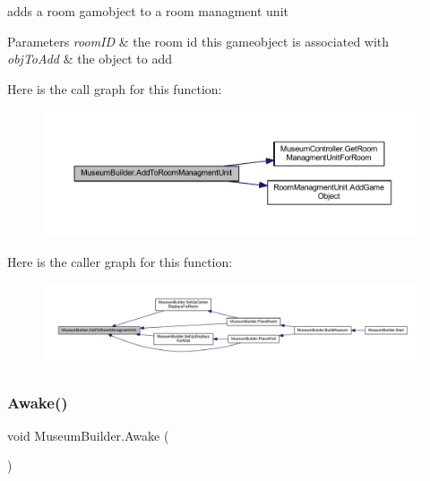 adds a room gamobject to a room managment unit 


\begin{DoxyParams}{Parameters}
{\em room\+ID} & the room id this gameobject is associated with\\
\hline
{\em obj\+To\+Add} & the object to add\\
\hline
\end{DoxyParams}
Here is the call graph for this function\+:
\nopagebreak
\begin{figure}[H]
\begin{center}
\leavevmode
\includegraphics[width=350pt]{class_museum_builder_ad1991ecd1258a2eb6d020d3c429ad9c8_cgraph}
\end{center}
\end{figure}
Here is the caller graph for this function\+:
\nopagebreak
\begin{figure}[H]
\begin{center}
\leavevmode
\includegraphics[width=350pt]{class_museum_builder_ad1991ecd1258a2eb6d020d3c429ad9c8_icgraph}
\end{center}
\end{figure}
\mbox{\label{class_museum_builder_a846546ea2e9bf91bba2a166dc2b01e2d}} 
\subsubsection{\texorpdfstring{Awake()}{Awake()}}
{\footnotesize\ttfamily void Museum\+Builder.\+Awake (\begin{DoxyParamCaption}{ }\end{DoxyParamCaption})\hspace{0.3cm}{\ttfamily [private]}}

